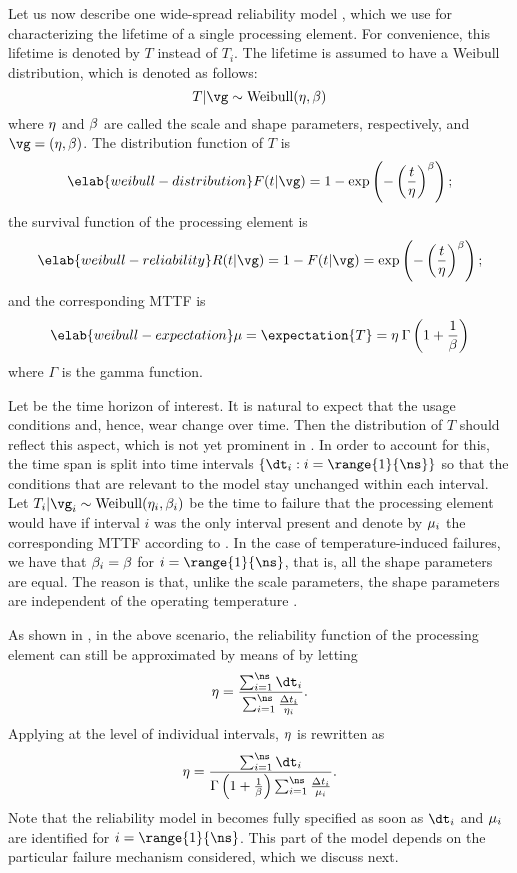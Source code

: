 Let us now describe one wide-spread reliability model \cite{huang2009b,
xiang2010}, which we use for characterizing the lifetime of a single processing
element. For convenience, this lifetime is denoted by $T$ instead of $T_i$. The
lifetime is assumed to have a Weibull distribution, which is denoted as follows:
\[
  T | \vg \sim \mathrm{Weibull}(\scale, \shape)
\]
where $\eta$ and $\beta$ are called the scale and shape parameters,
respectively, and $\vg = (\scale, \shape)$. The distribution function of $T$ is
\begin{equation} \elab{weibull-distribution}
  F(t | \vg) = 1 - \exp\left(-\left(\frac{t}{\scale}\right)^\shape\right);
\end{equation}
the survival function of the processing element is
\begin{equation} \elab{weibull-reliability}
  R(t | \vg) = 1 - F(t | \vg) = \exp\left(-\left(\frac{t}{\scale}\right)^\shape\right);
\end{equation}
and the corresponding \ac{MTTF} is
\begin{equation} \elab{weibull-expectation}
  \mean = \expectation{T} = \scale \: \Gamma\left(1 + \frac{1}{\shape}\right)
\end{equation}
where $\Gamma$ is the gamma function.

Let \period be the time horizon of interest. It is natural to expect that the
usage conditions and, hence, wear change over time. Then the distribution of $T$
should reflect this aspect, which is not yet prominent in
. In order to account for this, the time span is
split into \ns time intervals $\{ \dt_i: i = \range{1}{\ns} \}$ so that the
conditions that are relevant to the model stay unchanged within each interval.
Let $T_i | \vg_i \sim \mathrm{Weibull}(\scale_i, \shape_i)$ be the time to
failure that the processing element would have if interval $i$ was the only
interval present and denote by $\mu_i$ the corresponding \ac{MTTF} according
to . In the case of temperature-induced failures, we
have that $\beta_i = \beta$ for $i = \range{1}{\ns}$, that is, all the shape
parameters are equal. The reason is that, unlike the scale parameters, the shape
parameters are independent of the operating temperature \cite{chang2006}.

As shown in \cite{xiang2010}, in the above scenario, the reliability function of
the processing element can still be approximated by means of
 by letting
\[
  \scale = \frac{\sum_{i = 1}^\ns \dt_i}{\sum_{i = 1}^\ns \frac{\Delta t_i}{\scale_i}}.
\]
Applying  at the level of individual intervals,
$\eta$ is rewritten as
\[
  \scale = \frac{\sum_{i = 1}^\ns \dt_i}{\Gamma\left(1 + \frac{1}{\shape}\right) \sum_{i = 1}^\ns \frac{\Delta t_i}{\mean_i}}.
\]
Note that the reliability model in  becomes fully
specified as soon as $\dt_i$ and $\mu_i$ are identified for $i =
\range{1}{\ns}$. This part of the model depends on the particular failure
mechanism considered, which we discuss next.

